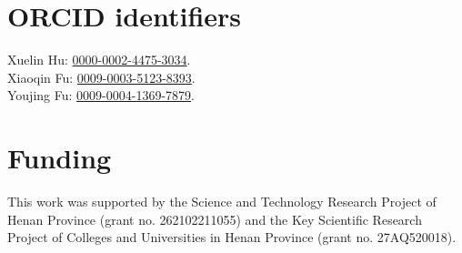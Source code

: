 \documentclass[11pt,a4paper]{article}
\begin{document}
\section*{ORCID identifiers}
Xuelin Hu: \href{https://orcid.org/0000-0002-4475-3034}{0000-0002-4475-3034}.\\
Xiaoqin Fu: \href{https://orcid.org/0009-0003-5123-8393}{0009-0003-5123-8393}.\\
Youjing Fu: \href{https://orcid.org/0009-0004-1369-7879}{0009-0004-1369-7879}.

\section*{Funding}
This work was supported by the Science and Technology Research Project of
Henan Province (grant no. 262102211055) and the Key Scientific Research Project
of Colleges and Universities in Henan Province (grant no. 27AQ520018).
\end{document}
